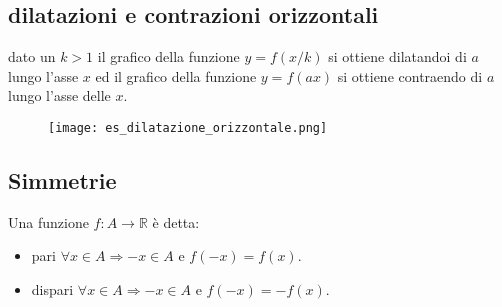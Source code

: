 \documentclass[../main.tex, class=article, 12pt]{subfiles}
\begin{document}
\subsection{dilatazioni e contrazioni orizzontali}\label{sec:dilatazioni_e_contrazioni_verticali}
dato un $ k > 1 $ il grafico della funzione $ y = f(x/k)$ si ottiene dilatandoi di $ a $ lungo 
l'asse $ x $ ed il grafico della funzione $ y = f(ax)$ si ottiene contraendo di $ a $
lungo l'asse delle $ x $.

\begin{figure}[H]
  	\texttt{[image: es\_dilatazione\_orizzontale.png]}
  	\caption{}
        \label{fig:es_dilatazione_verticale.png}
\end{figure}



\subsection{Simmetrie}\label{sec:simmetrie}
\begin{definition}
        Una funzione $ f: A \to \mathbb{R} $ è detta:
        \begin{itemize}
                \item pari $ \forall  x \in A \Rightarrow -x \in A$ e $ f(-x) = f(x) $.
                \item dispari $ \forall  x \in A \Rightarrow -x \in A$ e $ f(-x) = -f(x) $.
        \end{itemize}
\end{definition}
\end{document}
